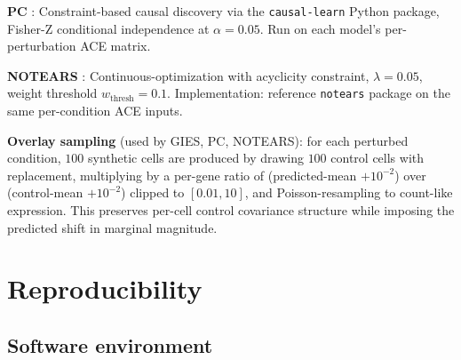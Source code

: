 \documentclass{article}
\theoremstyle{plain}
\theoremstyle{definition}
\theoremstyle{remark}
\begin{document}
\textbf{PC} \citep{spirtes2000}: Constraint-based causal discovery via the \texttt{causal-learn} Python package, Fisher-Z conditional independence at $\alpha = 0.05$. Run on each model's per-perturbation ACE matrix.

\textbf{NOTEARS} \citep{zheng2018notears}: Continuous-optimization with acyclicity constraint, $\lambda = 0.05$, weight threshold $w_{\mathrm{thresh}} = 0.1$. Implementation: reference \texttt{notears} package on the same per-condition ACE inputs.

\textbf{Overlay sampling} (used by GIES, PC, NOTEARS): for each perturbed condition, $100$ synthetic cells are produced by drawing $100$ control cells with replacement, multiplying by a per-gene ratio of (predicted-mean $+ 10^{-2}$) over (control-mean $+ 10^{-2}$) clipped to $[0.01, 10]$, and Poisson-resampling to count-like expression. This preserves per-cell control covariance structure while imposing the predicted shift in marginal magnitude.

\section{Reproducibility}
\label{app:reproducibility}

\subsection{Software environment}
\label{app:software}
\end{document}
